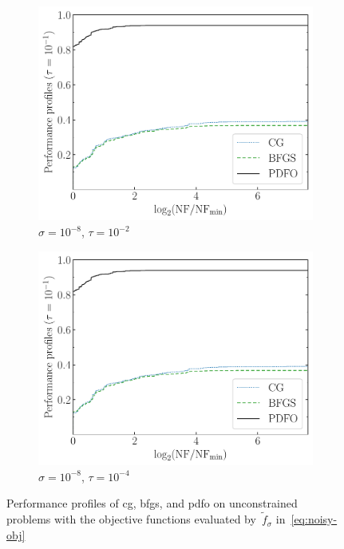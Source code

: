 \documentclass[
    smallextended,  %
    final,          %
]{svjour3}
\newcommand{\obj}{f}
\begin{document}
\begin{figure}[htbp]
\begin{subfigure}{.48\textwidth}
        \includegraphics[width=\textwidth,page=2]{perf-noisy-bfgs_cg_pdfo-50-8.pdf}
        \caption{$\sigma = 10^{-8}$, $\tau = 10^{-2}$}
    \end{subfigure}
    \hfill
    \begin{subfigure}{.48\textwidth}
        \centering
        \includegraphics[width=\textwidth,page=4]{perf-noisy-bfgs_cg_pdfo-50-8.pdf}
        \caption{$\sigma = 10^{-8}$, $\tau = 10^{-4}$}
    \end{subfigure}
    \caption{Performance profiles of \gls{cg}, \gls{bfgs}, and \gls{pdfo} on unconstrained problems
    with the objective functions evaluated by~$\tilde{\obj}_\sigma$ in~\eqref{eq:noisy-obj}}
    \label{fig:noise}
\end{figure}
\end{document}
